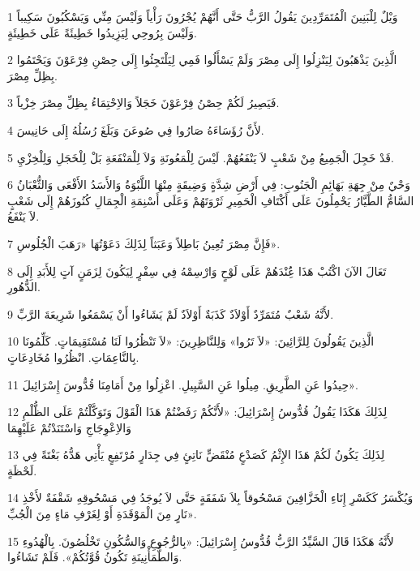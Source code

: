 \par 1 وَيْلٌ لِلْبَنِينَ الْمُتَمَرِّدِينَ يَقُولُ الرَّبُّ حَتَّى أَنَّهُمْ يُجْرُونَ رَأْياً وَلَيْسَ مِنِّي وَيَسْكُبُونَ سَكِيباً وَلَيْسَ بِرُوحِي لِيَزِيدُوا خَطِيئَةً عَلَى خَطِيئَةٍ.
\par 2 الَّذِينَ يَذْهَبُونَ لِيَنْزِلُوا إِلَى مِصْرَ وَلَمْ يَسْأَلُوا فَمِي لِيَلْتَجِئُوا إِلَى حِصْنِ فِرْعَوْنَ وَيَحْتَمُوا بِظِلِّ مِصْرَ.
\par 3 فَيَصِيرُ لَكُمْ حِصْنُ فِرْعَوْنَ خَجَلاً وَالاِحْتِمَاءُ بِظِلِّ مِصْرَ خِزْياً.
\par 4 لأَنَّ رُؤَسَاءَهُ صَارُوا فِي صُوعَنَ وَبَلَغَ رُسُلُهُ إِلَى حَانِيسَ.
\par 5 قَدْ خَجِلَ الْجَمِيعُ مِنْ شَعْبٍ لاَ يَنْفَعُهُمْ. لَيْسَ لِلْمَعُونَةِ وَلاَ لِلْمَنْفَعَةِ بَلْ لِلْخَجَلِ وَلِلْخِزْيِ.
\par 6 وَحْيٌ مِنْ جِهَةِ بَهَائِمِ الْجَنُوبِ: فِي أَرْضِ شِدَّةٍ وَضِيقَةٍ مِنْهَا اللَّبْوَةُ وَالأَسَدُ الأَفْعَى وَالثُّعْبَانُ السَّامُّ الطَّيَّارُ يَحْمِلُونَ عَلَى أَكْتَافِ الْحَمِيرِ ثَرْوَتَهُمْ وَعَلَى أَسْنِمَةِ الْجِمَالِ كُنُوزَهُمْ إِلَى شَعْبٍ لاَ يَنْفَعُ.
\par 7 فَإِنَّ مِصْرَ تُعِينُ بَاطِلاً وَعَبَثاً لِذَلِكَ دَعَوْتُهَا «رَهَبَ الْجُلُوسِ».
\par 8 تَعَالَ الآنَ اكْتُبْ هَذَا عَُِنْدَهُمْ عَلَى لَوْحٍ وَارْسِمْهُ فِي سِفْرٍ لِيَكُونَ لِزَمَنٍ آتٍ لِلأَبَدِ إِلَى الدُّهُورِ.
\par 9 لأَنَّهُ شَعْبٌ مُتَمَرِّدٌ أَوْلاَدٌ كَذَبَةٌ أَوْلاَدٌ لَمْ يَشَاءُوا أَنْ يَسْمَعُوا شَرِيعَةَ الرَّبِّ.
\par 10 الَّذِينَ يَقُولُونَ لِلرَّائِينَ: «لاَ تَرُوا» وَلِلنَّاظِرِينَ: «لاَ تَنْظُرُوا لَنَا مُسْتَقِيمَاتٍ. كَلِّمُونَا بِالنَّاعِمَاتِ. انْظُرُوا مُخَادِعَاتٍ.
\par 11 حِيدُوا عَنِ الطَّرِيقِ. مِيلُوا عَنِ السَّبِيلِ. اعْزِلُوا مِنْ أَمَامِنَا قُدُّوسَ إِسْرَائِيلَ».
\par 12 لِذَلِكَ هَكَذَا يَقُولُ قُدُّوسُ إِسْرَائِيلَ: «لأَنَّكُمْ رَفَضْتُمْ هَذَا الْقَوْلَ وَتَوَكَّلْتُمْ عَلَى الظُّلْمِ وَالاِعْوِجَاجِ وَاسْتَنَدْتُمْ عَلَيْهِمَا
\par 13 لِذَلِكَ يَكُونُ لَكُمْ هَذَا الإِثْمُ كَصَدْعٍ مُنْقَضٍّ نَاتِئٍ فِي جِدَارٍ مُرْتَفِعٍ يَأْتِي هَدُّهُ بَغْتَةً فِي لَحْظَةٍ.
\par 14 وَيُكْسَرُ كَكَسْرِ إِنَاءِ الْخَزَّافِينَ مَسْحُوقاً بِلاَ شَفَقَةٍ حَتَّى لاَ يُوجَدُ فِي مَسْحُوقِهِ شَقْفَةٌ لأَخْذِ نَارٍ مِنَ الْمَوْقَدَةِ أَوْ لِغَرْفِ مَاءٍ مِنَ الْجُبِّ».
\par 15 لأَنَّهُ هَكَذَا قَالَ السَّيِّدُ الرَّبُّ قُدُّوسُ إِسْرَائِيلَ: «بِالرُّجُوعِ وَالسُّكُونِ تَخْلُصُونَ. بِالْهُدُوءِ وَالطُّمَأْنِينَةِ تَكُونُ قُوَّتُكُمْ». فَلَمْ تَشَاءُوا.

